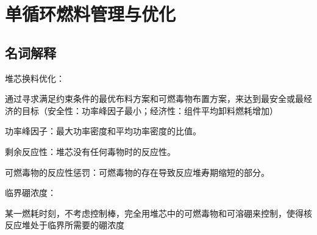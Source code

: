 \documentclass[openany]{ctexart}
\numberwithin{equation}{section} %
\begin{document}
\newpage

\section{单循环燃料管理与优化}
\subsection{名词解释}
堆芯换料优化：\hspace{0.11111em}
\begin{minipage}[t]{\linewidth}
	通过寻求满足约束条件的最优布料方案和可燃毒物布置方案，来达到最安全或最经\newline
	济的目标（安全性：功率峰因子最小；经济性：组件平均卸料燃耗增加）
\end{minipage}
\vspace{0.03cm}

功率峰因子：最大功率密度和平均功率密度的比值。

剩余反应性：堆芯没有任何毒物时的反应性。

可燃毒物的反应性惩罚：可燃毒物的存在导致反应堆寿期缩短的部分。

临界硼浓度：\hspace{0.11111em}
\begin{minipage}[t]{\linewidth}
   某一燃耗时刻，不考虑控制棒，完全用堆芯中的可燃毒物和可溶硼来控制，使得核反应堆处于临界所需要的硼浓度
\end{minipage}
\vspace{0.03cm}
\end{document}
